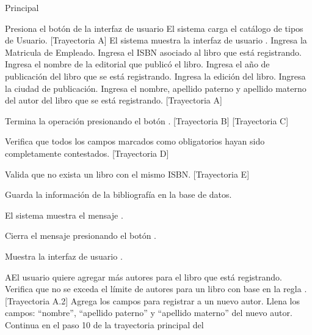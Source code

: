 \begin{UCtrayectoria}{Principal}

    \UCpaso[\UCactor] Presiona el botón  de la interfaz de usuario 
    \UCpaso El sistema carga el catálogo de tipos de Usuario. [Trayectoria A]
    \UCpaso El sistema muestra la interfaz de usuario .
    \UCpaso[\UCactor] Ingresa la Matricula de Empleado.
    \UCpaso[\UCactor] Ingresa el ISBN asociado al libro que está registrando.
    \UCpaso[\UCactor] Ingresa el nombre de la editorial que publicó el libro.
    \UCpaso[\UCactor] Ingresa el año de publicación del libro que se está registrando.
    \UCpaso[\UCactor] Ingresa la edición del libro.
    \UCpaso[\UCactor] Ingresa la ciudad de publicación.
    \UCpaso[\UCactor] Ingresa el nombre, apellido paterno y apellido materno  del autor del libro que se está registrando. [Trayectoria A]


    \UCpaso[\UCactor] Termina la operación presionando el botón . [Trayectoria B] [Trayectoria C]

    \UCpaso Verifica que todos los campos marcados como obligatorios hayan sido completamente contestados. [Trayectoria D]

    \UCpaso Valida que no exista un libro con el mismo ISBN. [Trayectoria E]

    \UCpaso Guarda la información de la bibliografía en la base de datos.

    \UCpaso El sistema muestra el mensaje .

    \UCpaso[\UCactor] Cierra el mensaje presionando el botón .

    \UCpaso Muestra la interfaz de usuario .
\end{UCtrayectoria}


\begin{UCtrayectoriaA}{A}{El usuario quiere agregar más autores para el libro que está registrando.}
    \UCpaso Verifica que no se exceda el límite de autores para un libro con base en la regla . [Trayectoria A.2]
    \UCpaso Agrega los campos para registrar a un nuevo autor.
    \UCpaso[\UCactor] Llena los campos: ``nombre'', ``apellido paterno'' y ``apellido materno'' del nuevo autor.
    \UCpaso Continua en el paso 10 de la trayectoria principal del 
\end{UCtrayectoriaA}

